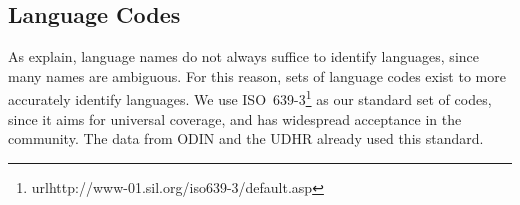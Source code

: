 



\subsection{Language Codes}
As  explain, language names do not always suffice to identify languages, since many names are ambiguous. For this reason, sets of language codes exist to more accurately identify languages. We use ISO~639-3\footnote{url{http://www-01.sil.org/iso639-3/default.asp}} as our standard set of codes, since it aims for universal coverage, and has widespread acceptance in the community. The data from ODIN and the UDHR already used this standard.

